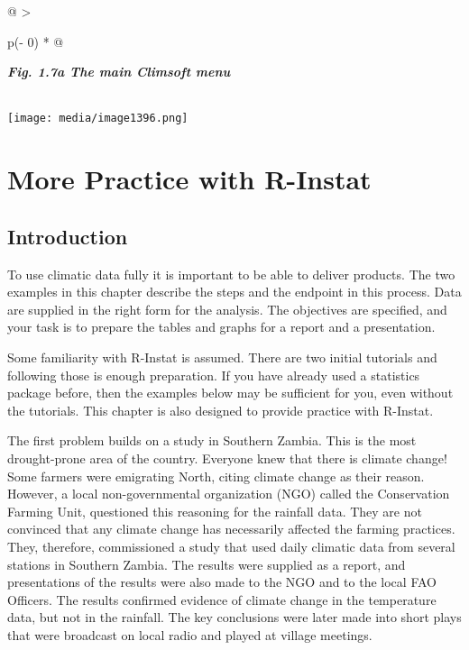 \documentclass[
  letterpaper,
  DIV=11,
  numbers=noendperiod]{scrreprt}
\begin{document}
\begin{longtable}[]{@{}
  >{\raggedright\arraybackslash}p{(\columnwidth - 0\tabcolsep) * }@{}}
\toprule\noalign{}
\begin{minipage}[b]{\linewidth}\raggedright
\textbf{\emph{Fig. 1.7a The main Climsoft menu}}
\end{minipage} \\
\midrule\noalign{}
\endhead
\bottomrule\noalign{}
\endlastfoot
\texttt{[image: media/image1396.png]} \\
\end{longtable}


\chapter{More Practice with R-Instat}\label{more-practice-with-r-instat}

\section{Introduction}\label{introduction}

To use climatic data fully it is important to be able to deliver
products. The two examples in this chapter describe the steps and the
endpoint in this process. Data are supplied in the right form for the
analysis. The objectives are specified, and your task is to prepare the
tables and graphs for a report and a presentation.

Some familiarity with R-Instat is assumed. There are two initial
tutorials and following those is enough preparation. If you have already
used a statistics package before, then the examples below may be
sufficient for you, even without the tutorials. This chapter is also
designed to provide practice with R-Instat.

The first problem builds on a study in Southern Zambia. This is the most
drought-prone area of the country. Everyone knew that there is
\textquotesingle climate change\textquotesingle! Some farmers were
emigrating North, citing climate change as their reason. However, a
local non-governmental organization (NGO) called the Conservation
Farming Unit, questioned this reasoning for the rainfall data. They are
not convinced that any climate change has necessarily affected the
farming practices. They, therefore, commissioned a study that used daily
climatic data from several stations in Southern Zambia. The results were
supplied as a report, and presentations of the results were also made to
the NGO and to the local FAO Officers. The results confirmed evidence of
climate change in the temperature data, but not in the rainfall. The key
conclusions were later made into short plays that were broadcast on
local radio and played at village meetings.
\end{document}
